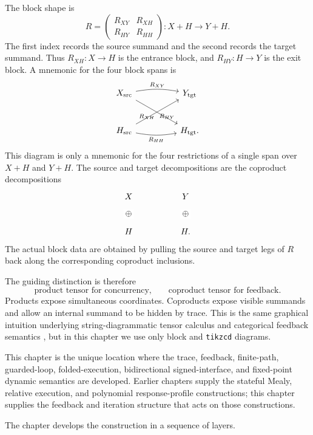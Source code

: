 The block shape is
\[
  R =
  \begin{pmatrix}
    R_{XY} & R_{XH}\\
    R_{HY} & R_{HH}
  \end{pmatrix}
  :
  X+H \longrightarrow Y+H .
\]
The first index records the source summand and the second records the target
summand. Thus \(R_{XH}:X\to H\) is the entrance block, and
\(R_{HY}:H\to Y\) is the exit block. A mnemonic for the four block spans is
\[
\begin{tikzcd}[column sep=huge,row sep=large]
  X_{\mathrm{src}}
    \ar[r,bend left=10,"R_{XY}"]
    \ar[dr,"R_{XH}"']
  &
  Y_{\mathrm{tgt}}
  \\
  H_{\mathrm{src}}
    \ar[ur,"R_{HY}"']
    \ar[r,bend right=10,swap,"R_{HH}"]
  &
  H_{\mathrm{tgt}} .
\end{tikzcd}
\]
This diagram is only a mnemonic for the four restrictions of a single span
over \(X+H\) and \(Y+H\). The source and target decompositions are the
coproduct decompositions
\[
\begin{tikzcd}[column sep=huge,row sep=large]
  X
    \ar[d,phantom,"\oplus" description]
  &
  Y
    \ar[d,phantom,"\oplus" description]
  \\
  H
  &
  H .
\end{tikzcd}
\]
The actual block data are obtained by pulling the source and target legs of
\(R\) back along the corresponding coproduct inclusions.

The guiding distinction is therefore
\[
  \text{product tensor for concurrency,}
  \qquad
  \text{coproduct tensor for feedback.}
\]
Products expose simultaneous coordinates. Coproducts expose visible summands
and allow an internal summand to be hidden by trace. This is the same
graphical intuition underlying string-diagrammatic tensor calculus and
categorical feedback semantics
\cite{JoyalStreet1991GeometryTensorCalculus,KatisSabadiniWalters2002FeedbackTraceFixedPoint},
but in this chapter we use only block and \texttt{tikzcd} diagrams.

This chapter is the unique location where the trace, feedback, finite-path,
guarded-loop, folded-execution, bidirectional signed-interface, and
fixed-point dynamic semantics are developed. Earlier chapters supply the
stateful Mealy, relative execution, and polynomial response-profile
constructions; this chapter supplies the feedback and iteration structure that
acts on those constructions.

The chapter develops the construction in a sequence of layers.

